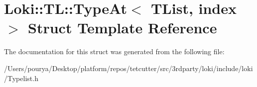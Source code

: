 \hypertarget{structLoki_1_1TL_1_1TypeAt}{}\section{Loki\+:\+:T\+L\+:\+:Type\+At$<$ T\+List, index $>$ Struct Template Reference}
\label{structLoki_1_1TL_1_1TypeAt}


The documentation for this struct was generated from the following file\+:\begin{DoxyCompactItemize}
\item 
/\+Users/pourya/\+Desktop/platform/repos/tetcutter/src/3rdparty/loki/include/loki/Typelist.\+h\end{DoxyCompactItemize}
